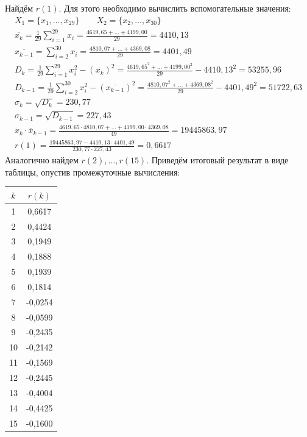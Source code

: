 \documentclass[utf8, a4paper, 14pt, russian, oneside]{book}
\begin{document}
Найдём $r(1)$. Для этого необходимо вычислить вспомогательные значения:
\begin{gather*}
    X_1 = \{x_1, \ldots, x_{29}\} \qquad X_2 = \{x_2, \ldots, x_{30}\} \\
    \overline{x_k} = \frac{1}{29} \sum_{i=1}^{29} x_i = \frac{4619,65 + \ldots + 4199,00}{29} = 4410,13 \\ 
    \overline{x_{k-1}} = \sum_{i=2}^{30} x_i = \frac{4810,07 + \ldots + 4369,08}{29} = 4401,49 \\
    D_k = \frac{1}{29} \sum_{i=1}^{29} x_i^2 - (\overline{x_k})^2 = \frac{4619,65^2 + \ldots + 4199,00^2}{29} - 4410,13^2 = 53255,96 \\
    D_{k-1} = \frac{1}{29} \sum_{i=2}^{30} x_i^2 - (\overline{x_{k-1}})^2 = \frac{4810,07^2 + \ldots + 4369,08^2}{29} - 4401,49^2 = 51722,63 \\
    \sigma_k = \sqrt{D_k} = 230,77 \\
    \sigma_{k-1} = \sqrt{D_{k-1}} = 227,43 \\
    \overline{x_k \cdot x_{k-1}} = \frac{4619,65 \cdot 4810,07 + \ldots + 4199,00 \cdot 4369,08}{49} = 19445863,97 \\
    r(1) = \frac{19445863,97 - 4410,13 \cdot 4401,49}{230,77 \cdot 227,43} = 0,6617
\end{gather*}
Аналогично найдем $r(2), \ldots, r(15)$. Приведём итоговый результат в виде таблицы, опустив промежуточные вычисления:
\begin{table}[h!]
    \centering    
    \begin{tabular}{|c|c|}
        \hline
        $k$ & $r(k)$ \\ \hline
        1 & 0,6617 \\ \hline
        2 & 0,4424 \\ \hline
        3 & 0,1949 \\ \hline
        4 & 0,1888 \\ \hline
        5 & 0,1939 \\ \hline
        6 & 0,1814 \\ \hline
        7 & -0,0254 \\ \hline
        8 & -0,0599 \\ \hline
        9 & -0,2435 \\ \hline
        10 & -0,2142 \\ \hline
        11 & -0,1569 \\ \hline
        12 & -0,2445 \\ \hline
        13 & -0,4004 \\ \hline
        14 & -0,4425 \\ \hline
        15 & -0,1600 \\ \hline
    \end{tabular}
\end{table}
\end{document}
